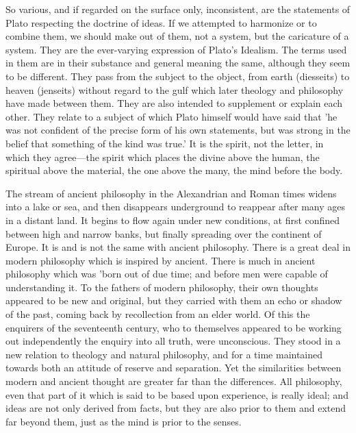 \documentclass[11pt,letter]{article}
\begin{document}
\par  So various, and if regarded on the surface only, inconsistent, are the statements of Plato respecting the doctrine of ideas. If we attempted to harmonize or to combine them, we should make out of them, not a system, but the caricature of a system. They are the ever-varying expression of Plato's Idealism. The terms used in them are in their substance and general meaning the same, although they seem to be different. They pass from the subject to the object, from earth (diesseits) to heaven (jenseits) without regard to the gulf which later theology and philosophy have made between them. They are also intended to supplement or explain each other. They relate to a subject of which Plato himself would have said that 'he was not confident of the precise form of his own statements, but was strong in the belief that something of the kind was true.' It is the spirit, not the letter, in which they agree—the spirit which places the divine above the human, the spiritual above the material, the one above the many, the mind before the body.

\par  The stream of ancient philosophy in the Alexandrian and Roman times widens into a lake or sea, and then disappears underground to reappear after many ages in a distant land. It begins to flow again under new conditions, at first confined between high and narrow banks, but finally spreading over the continent of Europe. It is and is not the same with ancient philosophy. There is a great deal in modern philosophy which is inspired by ancient. There is much in ancient philosophy which was 'born out of due time; and before men were capable of understanding it. To the fathers of modern philosophy, their own thoughts appeared to be new and original, but they carried with them an echo or shadow of the past, coming back by recollection from an elder world. Of this the enquirers of the seventeenth century, who to themselves appeared to be working out independently the enquiry into all truth, were unconscious. They stood in a new relation to theology and natural philosophy, and for a time maintained towards both an attitude of reserve and separation. Yet the similarities between modern and ancient thought are greater far than the differences. All philosophy, even that part of it which is said to be based upon experience, is really ideal; and ideas are not only derived from facts, but they are also prior to them and extend far beyond them, just as the mind is prior to the senses.
\end{document}
